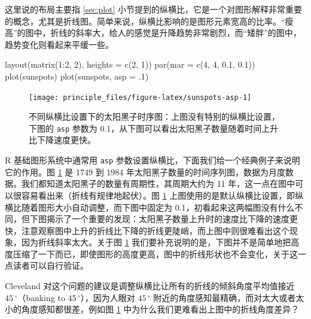 \documentclass[
  b5paper,
  UTF8,twoside]{book}
\newenvironment{Shaded}{\begin{snugshade}}{\end{snugshade}}
\newcommand{\AttributeTok}[1]{\textcolor[rgb]{0.77,0.63,0.00}{#1}}
\newcommand{\DecValTok}[1]{\textcolor[rgb]{0.00,0.00,0.81}{#1}}
\newcommand{\FloatTok}[1]{\textcolor[rgb]{0.00,0.00,0.81}{#1}}
\newcommand{\FunctionTok}[1]{\textcolor[rgb]{0.00,0.00,0.00}{#1}}
\newcommand{\NormalTok}[1]{#1}
\newcommand{\SpecialCharTok}[1]{\textcolor[rgb]{0.00,0.00,0.00}{#1}}
\begin{document}
这里说的布局主要指 \ref{sec:plot} 小节提到的纵横比，它是一个对图形解释非常重要的概念，尤其是折线图。简单来说，纵横比影响的是图形元素宽高的比率。``瘦高''的图中，折线的斜率大，给人的感觉是升降趋势非常剧烈，而``矮胖''的图中，趋势变化则看起来平缓一些。

\begin{Shaded}
\begin{Highlighting}[]
\FunctionTok{layout}\NormalTok{(}\FunctionTok{matrix}\NormalTok{(}\DecValTok{1}\SpecialCharTok{:}\DecValTok{2}\NormalTok{, }\DecValTok{2}\NormalTok{), }\AttributeTok{heights =} \FunctionTok{c}\NormalTok{(}\DecValTok{2}\NormalTok{, }\DecValTok{1}\NormalTok{))}
\FunctionTok{par}\NormalTok{(}\AttributeTok{mar =} \FunctionTok{c}\NormalTok{(}\DecValTok{4}\NormalTok{, }\DecValTok{4}\NormalTok{, }\FloatTok{0.1}\NormalTok{, }\FloatTok{0.1}\NormalTok{))}
\FunctionTok{plot}\NormalTok{(sunspots)}
\FunctionTok{plot}\NormalTok{(sunspots, }\AttributeTok{asp =}\NormalTok{ .}\DecValTok{1}\NormalTok{)}
\end{Highlighting}
\end{Shaded}

\begin{figure}

{\centering \texttt{[image: principle\_files/figure-latex/sunspots-asp-1]} 

}

\caption[不同纵横比设置下的太阳黑子时序图]{不同纵横比设置下的太阳黑子时序图：上图没有特别的纵横比设置，下图的 \texttt{asp} 参数为 0.1，从下图可以看出太阳黑子数量随着时间上升比下降速度更快。}\label{fig:sunspots-asp}
\end{figure}



R 基础图形系统中通常用 \texttt{asp} 参数设置纵横比，下面我们给一个经典例子来说明它的作用。图 \ref{fig:sunspots-asp} 是 1749 到 1984 年太阳黑子数量的时间序列图，数据为月度数据。我们都知道太阳黑子的数量有周期性，其周期大约为 11 年，这一点在图中可以很容易看出来（折线有规律地起伏）。图 \ref{fig:sunspots-asp} 上图使用的是默认纵横比设置，即纵横比随着图形大小自动调整，而下图中固定为 0.1，初看起来这两幅图没有什么不同，但下图揭示了一个重要的发现：太阳黑子数量上升时的速度比下降的速度更快，注意观察图中上升的折线比下降的折线更陡峭，而上图中则很难看出这个现象，因为折线斜率太大。关于图 \ref{fig:sunspots-asp} 我们要补充说明的是，下图并不是简单地把高度压缩了一下而已，即使图形的高度更高，图中的折线形状也不会变化，关于这一点读者可以自行验证。

Cleveland 对这个问题的建议是调整纵横比让所有的折线的倾斜角度平均值接近 \(45\,^{\circ}\)（banking to \(45\,^{\circ}\)），因为人眼对 \(45\,^{\circ}\) 附近的角度感知最精确，而对太大或者太小的角度感知都很差，例如图 \ref{fig:sunspots-asp} 中为什么我们更难看出上图中的折线角度差异？
\end{document}
